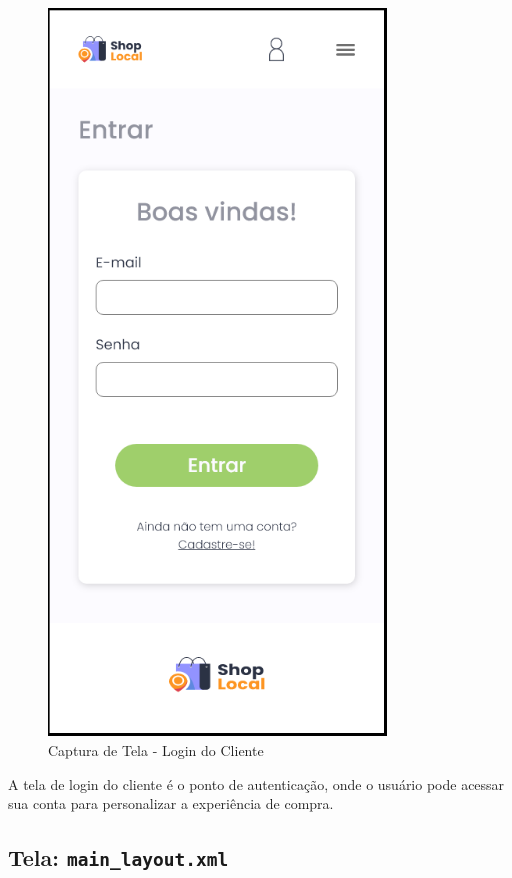 \documentclass[
	12pt,				%
	openright,			%
	twoside,			%
	a4paper,			%
	english,			%
	brazil				%
	]{abntex2}
\begin{document}
\begin{figure}[htb]
    \centering
    \includegraphics[width=0.8\textwidth]{img/logincliente}
    \caption{Captura de Tela - Login do Cliente}
\end{figure}

A tela de login do cliente é o ponto de autenticação, onde o usuário pode acessar sua conta para personalizar a experiência de compra.

\subsection{Tela: \texttt{main\_layout.xml}}
\end{document}
